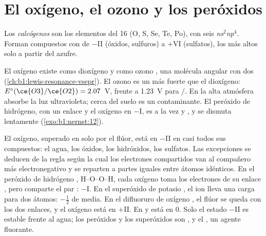 \section{El oxígeno, el ozono y los peróxidos}

\begin{definition}[Calcógenos]\label{def:b1:p-block-16-18:chalcogen}
Los \emph{calcógenos} son los elementos del  16
(O, S, Se, Te, Po), con seis 
\textit{ns}$^2$\textit{np}$^4$. Forman compuestos con  de $-$II (óxidos, sulfuros) a $+$VI (sulfatos), los más altos
solo a partir del azufre.
\end{definition}

El oxígeno existe como dioxígeno  y como ozono , una
molécula angular con dos 
(\cref{ch:b1:lewis-resonance-vsepr}). El ozono es un  más fuerte
que el dioxígeno: $E^\circ(\ce{O3}/\ce{O2}) = 2.07$~V, frente a 1.23~V
para /. En la alta atmósfera absorbe la luz ultravioleta;
cerca del suelo es un contaminante. El peróxido de hidrógeno, con un
enlace  y el oxígeno en $-$I, es a la vez  y , y
se dismuta lentamente (\cref{exo:b1:nernst:12}).

\begin{example}
El oxígeno, superado en  solo por el flúor, está en
$-$II en casi todos sus compuestos: el agua, los óxidos, los hidróxidos,
los sulfatos. Las excepciones se deducen de la regla según la cual los
electrones compartidos van al compañero más electronegativo y se reparten
a partes iguales entre átomos idénticos. En el peróxido de hidrógeno
, H--O--O--H, cada oxígeno toma los electrones de su enlace
, pero comparte el par : $-$I. En el superóxido de potasio
, el ion  lleva una carga para dos átomos: $-\frac12$ de
media. En el difluoruro de oxígeno , el flúor se queda con los
dos enlaces, y el oxígeno está en $+$II. En  y  está en 0.
Solo el estado $-$II es estable frente al agua; los peróxidos y los
superóxidos son , y el , un agente fluorante.
\end{example}


